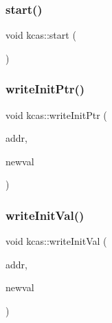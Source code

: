 \mbox{\label{namespacekcas_a39af7f008e3b3cb3815045257d15e735}} 
\subsubsection{\texorpdfstring{start()}{start()}}
{\footnotesize\ttfamily void kcas\+::start (\begin{DoxyParamCaption}{ }\end{DoxyParamCaption})}

\mbox{\label{namespacekcas_a92e383d96831fa6163a3d562d4a38053}} 
\subsubsection{\texorpdfstring{write\+Init\+Ptr()}{writeInitPtr()}}
{\footnotesize\ttfamily void kcas\+::write\+Init\+Ptr (\begin{DoxyParamCaption}\item[{\hyperlink{rq__unsafe_8h_ad45142aaf2ff20a036dc6242b8483e9c}{casword\+\_\+t} volatile $\ast$}]{addr,  }\item[{\hyperlink{rq__unsafe_8h_ad45142aaf2ff20a036dc6242b8483e9c}{casword\+\_\+t} const}]{newval }\end{DoxyParamCaption})}

\mbox{\label{namespacekcas_abd890f3f111dbd76aba1be89220ea07d}} 
\subsubsection{\texorpdfstring{write\+Init\+Val()}{writeInitVal()}}
{\footnotesize\ttfamily void kcas\+::write\+Init\+Val (\begin{DoxyParamCaption}\item[{\hyperlink{rq__unsafe_8h_ad45142aaf2ff20a036dc6242b8483e9c}{casword\+\_\+t} volatile $\ast$}]{addr,  }\item[{\hyperlink{rq__unsafe_8h_ad45142aaf2ff20a036dc6242b8483e9c}{casword\+\_\+t} const}]{newval }\end{DoxyParamCaption})}



